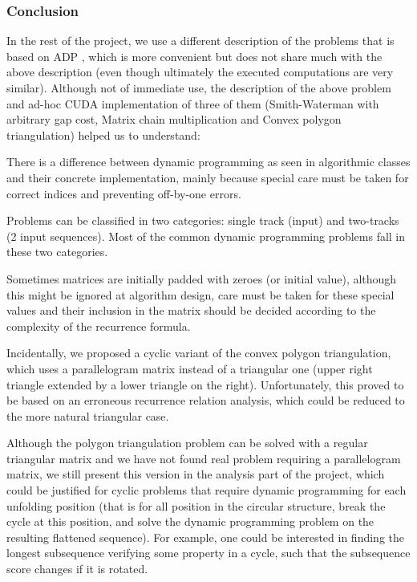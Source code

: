\subsubsection{Conclusion}
In the rest of the project, we use a different description of the problems that is based on ADP \cite{adp}, which is more convenient but does not share much with the above description (even though ultimately the executed computations are very similar). Although not of immediate use, the description of the above problem and ad-hoc CUDA implementation of three of them (Smith-Waterman with arbitrary gap cost, Matrix chain multiplication and Convex polygon triangulation) helped us to understand:\ol
\item There is a difference between dynamic programming as seen in algorithmic classes and their concrete implementation, mainly because special care must be taken for correct indices and preventing off-by-one errors.
\item Problems can be classified in two categories: single track (input) and two-tracks (2 input sequences). Most of the common dynamic programming problems fall in these two categories.
\item Sometimes matrices are initially padded with zeroes (or initial value), although this might be ignored at algorithm design, care must be taken for these special values and their inclusion in the matrix should be decided according to the complexity of the recurrence formula.
\item Incidentally, we proposed a cyclic variant of the convex polygon triangulation, which uses a parallelogram matrix instead of a triangular one (upper right triangle extended by a lower triangle on the right). Unfortunately, this proved to be based on an erroneous recurrence relation analysis, which could be reduced to the more natural triangular case.

Although the polygon triangulation problem can be solved with a regular triangular matrix and we have not found real problem requiring a parallelogram matrix, we still present this version in the analysis part of the project, which could be justified for cyclic problems that require dynamic programming for each unfolding position (that is for all position in the circular structure, break the cycle at this position, and solve the dynamic programming problem on the resulting flattened sequence). For example, one could be interested in finding the longest subsequence verifying some property in a cycle, such that the subsequence score changes if it is rotated.
\ole

